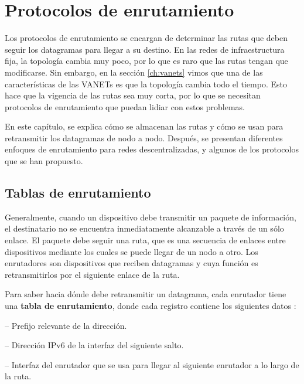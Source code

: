 ﻿\chapter{Protocolos de enrutamiento}
\label{ch:protocolos_de_enrutamiento}

Los protocolos de enrutamiento se encargan de determinar las rutas que deben
seguir los datagramas para llegar a su destino. En las redes de
infraestructura fija, la topología cambia muy poco, por lo que es raro que las
rutas tengan que modificarse. Sin embargo, en la sección \ref{ch:vanets} vimos
que una de las características de las VANETs es que la topología cambia todo el
tiempo. Esto hace que la vigencia de las rutas sea muy corta, por lo que se
necesitan protocolos de enrutamiento que puedan lidiar con estos problemas.

En este capítulo, se explica cómo se almacenan las rutas y cómo se usan para
retransmitir los datagramas de nodo a nodo. Después, se presentan diferentes
enfoques de enrutamiento para redes descentralizadas, y algunos de los
protocolos que se han propuesto.

\section{Tablas de enrutamiento}
\label{sec:tablas_de_enrutamiento}

Generalmente, cuando un dispositivo debe transmitir un paquete de información,
el destinatario no se encuentra inmediatamente alcanzable a través de un sólo
enlace. El paquete debe seguir una ruta, que es una secuencia de enlaces entre
dispositivos mediante los cuales se puede llegar de un nodo a otro. Los
enrutadores son dispositivos que reciben datagramas y cuya función es
retransmitirlos por el siguiente enlace de la ruta.

Para saber hacia dónde debe retransmitir un datagrama, cada enrutador tiene una
\textbf{tabla de enrutamiento}, donde cada registro contiene los siguientes
datos \cite{Hagen2006}:

 -- Prefijo relevante de la
dirección.

 -- Dirección IPv6 de la interfaz del
siguiente salto.

 -- Interfaz del enrutador que se usa para
llegar al siguiente enrutador a lo largo de la ruta.

